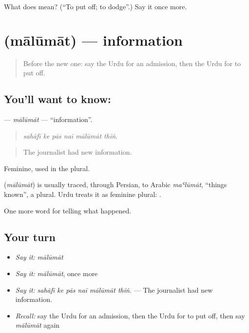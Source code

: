 \begin{tcolorbox}[breakable,colback=teal!4,colframe=teal!35!black,title={Before you move on}]
What does  mean? (\textquotedblleft{}To put off; to dodge\textquotedblright{}.) Say it once more.
\end{tcolorbox}
\section[\texorpdfstring{\ur{معلومات} (mālūmāt)}{معلومات (mālūmāt)}]{ (mālūmāt) — information}

\label{lesson:UR-C303-malumat}



\begin{quote}
Before the new one: say the Urdu for an admission, then the Urdu for to put off.
\end{quote}

\subsection*{You'll want to know: }
\textbf{} — \emph{mālūmāt} — \textquotedblleft{}information\textquotedblright{}.

\begin{quote}
     
\end{quote}

\begin{quote}
\emph{sahāfī ke pās naī mālūmāt thīṅ.}
\end{quote}

\begin{quote}
The journalist had new information.
\end{quote}

Feminine, used in the plural.

\begin{cousinweb}
\textbf{} (\emph{mālūmāt}) is usually traced, through Persian, to Arabic \emph{maʿlūmāt}, \textquotedblleft{}things known\textquotedblright{}, a plural. Urdu treats it as feminine plural: \textbf{  }.
\end{cousinweb}

\begin{grammarlens}[title={What you've built}]
One more word for telling what happened.
\end{grammarlens}

\subsection*{Your turn}
\begin{itemize}
\raggedright
  \item \emph{Say it:} \emph{mālūmāt}
  \item \emph{Say it:} \emph{mālūmāt}, once more
  \item \emph{Say it:} \emph{sahāfī ke pās naī mālūmāt thīṅ.} — The journalist had new information.
  \item \emph{Recall:} say the Urdu for an admission, then the Urdu for to put off, then say \emph{mālūmāt} again
\end{itemize}


